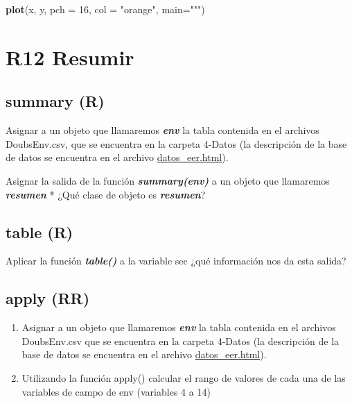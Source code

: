 \documentclass[]{book}
\newenvironment{Shaded}{\begin{snugshade}}{\end{snugshade}}
\newcommand{\DataTypeTok}[1]{\textcolor[rgb]{0.13,0.29,0.53}{#1}}
\newcommand{\DecValTok}[1]{\textcolor[rgb]{0.00,0.00,0.81}{#1}}
\newcommand{\KeywordTok}[1]{\textcolor[rgb]{0.13,0.29,0.53}{\textbf{#1}}}
\newcommand{\NormalTok}[1]{#1}
\newcommand{\StringTok}[1]{\textcolor[rgb]{0.31,0.60,0.02}{#1}}
\begin{document}
\begin{Shaded}
\begin{Highlighting}[]
\KeywordTok{plot}\NormalTok{(x, y, }\DataTypeTok{pch =} \DecValTok{16}\NormalTok{, }\DataTypeTok{col =} \StringTok{"orange"}\NormalTok{, }\DataTypeTok{main=}\StringTok{""")}
\end{Highlighting}
\end{Shaded}

\hypertarget{r12-resumir}{%
\chapter*{R12 Resumir}\label{r12-resumir}}

\hypertarget{summary-r}{%
\section{summary (R)}\label{summary-r}}

Asignar a un objeto que llamaremos \textbf{\emph{env}} la tabla contenida en el archivos DoubsEnv.csv, que se encuentra en la carpeta 4-Datos (la descripción de la base de datos se encuentra en el archivo \url{datos_eer.html}).

Asignar la salida de la función \textbf{\emph{summary(env)}} a un objeto que llamaremos \textbf{\emph{resumen}}
* ¿Qué clase de objeto es \textbf{\emph{resumen}}?

\hypertarget{table-r}{%
\section{table (R)}\label{table-r}}

Aplicar la función \textbf{\emph{table()}} a la variable sec
¿qué información nos da esta salida?

\hypertarget{apply-rr}{%
\section{apply (RR)}\label{apply-rr}}

\begin{enumerate}
\def\labelenumi{\arabic{enumi}.}
\item
  Asignar a un objeto que llamaremos \textbf{\emph{env}} la tabla contenida en el archivos DoubsEnv.csv que se encuentra en la carpeta 4-Datos (la descripción de la base de datos se encuentra en el archivo \url{datos_eer.html}).
\item
  Utilizando la función apply() calcular el rango de valores de cada una de las variables de campo de env (variables 4 a 14)
\end{enumerate}
\end{document}
